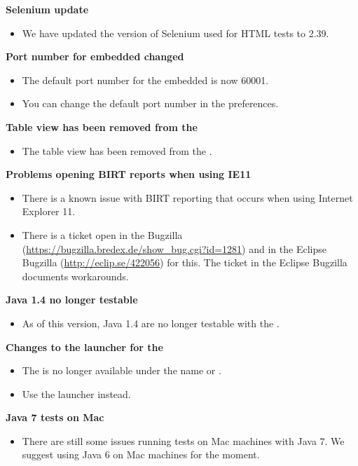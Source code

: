 \textbf{Selenium update}
\begin{itemize}
\item We have updated the version of Selenium used for HTML tests to 2.39.
\end{itemize}

\textbf{Port number for embedded \gdagent{} changed}
\begin{itemize}
\item The default port number for the embedded \gdagent{} is now 60001.
\item You can change the default port number in the preferences.
\end{itemize}

\textbf{Table view has been removed from the \gdomeditor{}}
\begin{itemize}
\item The table view has been removed from the \gdomeditor{}.
\end{itemize}

\textbf{Problems opening BIRT reports when using IE11}
\begin{itemize}
\item There is a known issue with BIRT reporting that occurs when using Internet Explorer 11. 
\item There is a ticket open in the \gd{} Bugzilla (\url{https://bugzilla.bredex.de/show_bug.cgi?id=1281}) and in the Eclipse Bugzilla (\url{http://eclip.se/422056}) for this. The ticket in the Eclipse Bugzilla documents workarounds.
\end{itemize}

\textbf{Java 1.4 \gdauts{} no longer testable}
\begin{itemize}
\item As of this version, Java 1.4 \gdauts{} are no longer testable with the \ite{}. 
\end{itemize}

\textbf{Changes to the launcher for the \gdagent{}}
\begin{itemize}
\item The \gdagent{} is no longer available under the name  or .
\item Use the launcher  instead.
\end{itemize}

\textbf{Java 7 tests on Mac}
\begin{itemize}
\item There are still some issues running tests on Mac machines with Java 7. We suggest using Java 6 on Mac machines for the moment.
\end{itemize}

